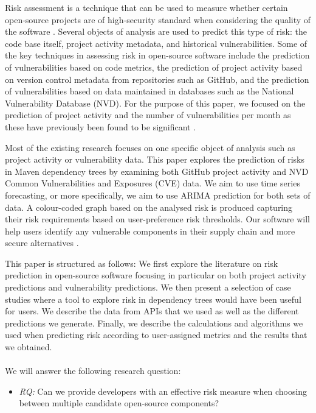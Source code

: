 \documentclass[conference]{IEEEtran}
\begin{document}
Risk assessment is a technique that can be used to measure whether certain open-source projects are of high-security standard when considering the quality of the software \cite{abunadi_towards_2015}. Several objects of analysis are used to predict this type of risk: the code base itself, project activity metadata, and historical vulnerabilities. Some of the key techniques in assessing risk in open-source software include the prediction of vulnerabilities based on code metrics, the prediction of project activity based on version control metadata from repositories such as GitHub, and the prediction of vulnerabilities based on data maintained in databases such as the National Vulnerability Database (NVD). For the purpose of this paper, we focused on the prediction of project activity and the number of vulnerabilities per month as these have previously been found to be significant \cite{xia_predicting_2022, s_wu_vulnerability_2020}. 

Most of the existing research focuses on one specific object of analysis such as project activity or vulnerability data. This paper explores the prediction of risks in Maven dependency trees by examining both GitHub project activity and NVD Common Vulnerabilities and Exposures (CVE) data. We aim to use time series forecasting, or more specifically, we aim to use ARIMA prediction for both sets of data. A colour-coded graph based on the analysed risk is produced capturing their risk requirements based on user-preference risk thresholds. Our software will help users identify any vulnerable components in their supply chain and more secure alternatives \cite{noauthor_open_nodate}. 

This paper is structured as follows: We first explore the literature on risk prediction in open-source software focusing in particular on both project activity predictions and vulnerability predictions. We then present a selection of case studies where a tool to explore risk in dependency trees would have been useful for users. We describe the data from APIs that we used as well as the different predictions we generate. Finally, we describe the calculations and algorithms we used when predicting risk according to user-assigned metrics and the results that we obtained. 
\\\\
We will answer the following research question:\\

\begin{itemize}
    \item \textit{RQ:} Can we provide developers with an effective risk measure when choosing between multiple candidate open-source components?\\
\end{itemize}
\end{document}
